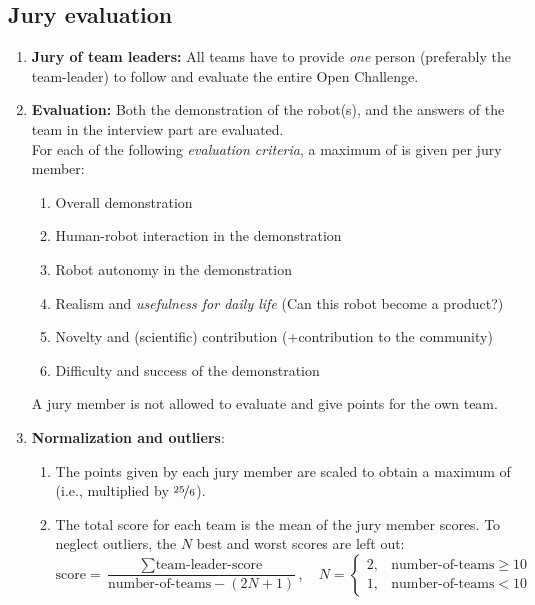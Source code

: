 \subsection{Jury evaluation}
\begin{enumerate}
  \item \textbf{Jury of team leaders:} All teams have to provide \emph{one} person 
  (preferably the team-leader) to follow and evaluate the entire Open Challenge.
  \item \textbf{Evaluation:} Both the demonstration of the robot(s), and the answers of the team in the interview part are evaluated.\\ 
  For each of the following \emph{evaluation criteria}, a maximum of  is given per jury member:
  \begin{enumerate}
  \item Overall demonstration
  \item Human-robot interaction in the demonstration
  \item Robot autonomy in the demonstration
  \item Realism and \emph{usefulness for daily life} (Can this robot become a product?)
  \item Novelty and (scientific) contribution (+contribution to the community)
  \item Difficulty and success of the demonstration 
  \end{enumerate}
  A jury member is not allowed to evaluate and give points for the own team.
  \item \textbf{Normalization and outliers}: 
  \begin{enumerate}
    \item The points given by each jury member are scaled to obtain a maximum of  (i.e., multiplied by $\nicefrac{25}{6}$). 
    \item The total score for each team is the mean of the jury member scores.
      To neglect outliers, the $N$ best and worst scores are left out:
      $$\mbox{score} = \frac{\sum\mbox{team-leader-score}}{\mbox{number-of-teams} - (2N+1)},
      \quad N=\begin{cases}2, & \mbox{number-of-teams} \ge 10\\1, & \mbox{number-of-teams} < 10 \end{cases}$$
    \end{enumerate}
\end{enumerate}

